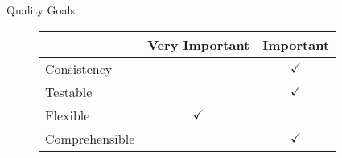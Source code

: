 \begin{frame}{Quality Goals}
\begin{figure}[]
		\begin{tabular}{| l | m{} | m{}|} \hline
 & Very Important&Important \\ \hline
Consistency  				&& \multicolumn{1}{c|}{$\checkmark$} 		\\ \hline
Testable  					&& \multicolumn{1}{c|}{$\checkmark$} 		\\ \hline
Flexible  					& \multicolumn{1}{c|}{$\checkmark$}& 		\\ \hline
Comprehensible  		&& \multicolumn{1}{c|}{$\checkmark$} 		\\ \hline
		\end{tabular}
	\label{fig:prioritizedCrit}
\end{figure}

\end{frame}